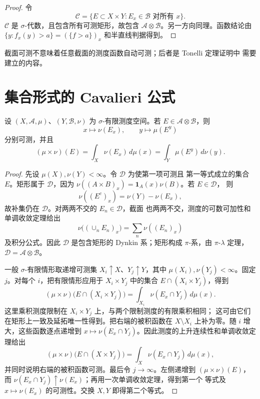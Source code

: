 \begin{proof}
令
\[
 \mathcal C=\{E\subset X\times Y:E_x\in\mathcal B
 \text{ 对所有 }x\}.
\]
\(\mathcal C\) 是 \(\sigma\)-代数，且包含所有可测矩形，故包含
\(\mathcal A\otimes\mathcal B\)。另一方向同理。函数结论由
\(\{y:f_x(y)>a\}=(\{f>a\})_x\) 和半直线判据得到。
\end{proof}

截面可测不意味着任意截面的测度函数自动可测；后者是 Tonelli 定理证明中
需要建立的内容。

\section{集合形式的 Cavalieri 公式}

\begin{theorem}
\label{thm:cavalieri-sets}
设 \((X,\mathcal A,\mu)\)、\((Y,\mathcal B,\nu)\) 为
\(\sigma\)-有限测度空间。若 \(E\in\mathcal A\otimes\mathcal B\)，则
\[
 x\longmapsto\nu(E_x),\qquad y\longmapsto\mu(E^y)
\]
分别可测，并且
\[
 (\mu\times\nu)(E)
 =\int_X\nu(E_x)\,d\mu(x)
 =\int_Y\mu(E^y)\,d\nu(y).
\]
\end{theorem}

\begin{proof}
先设 \(\mu(X),\nu(Y)<\infty\)。令 \(\mathcal D\) 为使第一项可测且
第一等式成立的集合 \(E\)。矩形属于 \(\mathcal D\)，因为
\(\nu((A\times B)_x)=\mathbf1_A(x)\nu(B)\)。若 \(E\in\mathcal D\)，
则
\[
 \nu((E^c)_x)=\nu(Y)-\nu(E_x),
\]
故补集仍在 \(\mathcal D\)。对两两不交的 \(E_n\in\mathcal D\)，截面
也两两不交，测度的可数可加性和单调收敛定理给出
\[
 \nu\bigl((\cup_nE_n)_x\bigr)=\sum_n\nu((E_n)_x)
\]
及积分公式。因此 \(\mathcal D\) 是包含矩形的 Dynkin 系；矩形构成
\(\pi\)-系，由 \(\pi\)-\(\lambda\) 定理，
\(\mathcal D=\mathcal A\otimes\mathcal B\)。

一般 \(\sigma\)-有限情形取递增可测集
\(X_i\uparrow X\)、\(Y_j\uparrow Y\)，其中
\(\mu(X_i),\nu(Y_j)<\infty\)。固定 \(j\)。对每个 \(i\)，把有限情形应用于
\(X_i\times Y_j\) 中的集合 \(E\cap(X_i\times Y_j)\)，得到
\[
 (\mu\times\nu)\bigl(E\cap(X_i\times Y_j)\bigr)
 =\int_{X_i}\nu(E_x\cap Y_j)\,d\mu(x).
\]
这里乘积测度限制在 \(X_i\times Y_j\) 上，与两个限制测度的有限乘积相同；
这可由它们在矩形上一致及延拓唯一性得到。把右端的被积函数在
\(X\setminus X_i\) 上补为零。随 \(i\) 增大，这些函数逐点递增到
\(x\mapsto\nu(E_x\cap Y_j)\)。因此测度的上升连续性和单调收敛定理给出
\[
 (\mu\times\nu)\bigl(E\cap(X\times Y_j)\bigr)
 =\int_X\nu(E_x\cap Y_j)\,d\mu(x),
\]
并同时说明右端的被积函数可测。最后令 \(j\to\infty\)。左侧递增到
\((\mu\times\nu)(E)\)，而
\(\nu(E_x\cap Y_j)\uparrow\nu(E_x)\)；再用一次单调收敛定理，得到第一个
等式及 \(x\mapsto\nu(E_x)\) 的可测性。交换 \(X,Y\) 即得第二个等式。
\end{proof}

